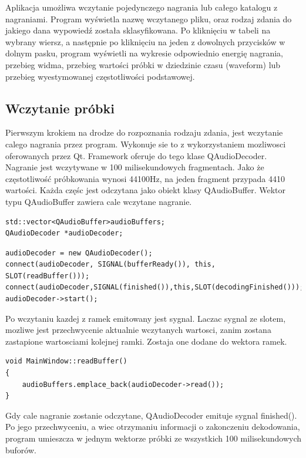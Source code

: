 \documentclass[a4paper,12 pt]{article}
\begin{document}
Aplikacja umożliwa wczytanie pojedynczego nagrania lub całego katalogu z nagraniami. Program wyświetla nazwę wczytanego pliku, oraz rodzaj zdania do jakiego dana wypowiedź została sklasyfikowana. Po kliknięciu w tabeli na wybrany wiersz, a następnie po kliknięciu na jeden z dowolnych przycisków w dolnym pasku, program wyświetli na wykresie odpowiednio energię nagrania, przebieg widma, przebieg wartości próbki w dziedzinie czasu (waveform) lub przebieg wyestymowanej częstotliwości podstawowej.
\subsection{Wczytanie próbki}
Pierwszym krokiem na drodze do rozpoznania rodzaju zdania, jest wczytanie calego nagrania przez program. Wykonuje sie to z wykorzystaniem mozliwosci oferowanych przez Qt. Framework oferuje do tego klase QAudioDecoder. 
Nagranie jest wczytywane w 100 milisekundowych fragmentach. Jako że częstotliwość próbkowania wynosi 44100Hz, na jeden fragment przypada 4410 wartości. Każda częśc jest odczytana jako obiekt klasy QAudioBuffer. Wektor typu QAudioBuffer zawiera cale wczytane nagranie.
\begin{lstlisting}
std::vector<QAudioBuffer>audioBuffers;
QAudioDecoder *audioDecoder;
\end{lstlisting}
\begin{lstlisting}
audioDecoder = new QAudioDecoder();
connect(audioDecoder, SIGNAL(bufferReady()), this, SLOT(readBuffer()));
connect(audioDecoder,SIGNAL(finished()),this,SLOT(decodingFinished()));
audioDecoder->start();
\end{lstlisting}
Po wczytaniu kazdej z ramek emitowany jest sygnal. Laczac sygnal ze slotem, mozliwe jest przechwycenie aktualnie wczytanych wartosci, zanim zostana zastapione wartosciami kolejnej ramki.
Zostaja one dodane do wektora ramek.
\begin{lstlisting}
void MainWindow::readBuffer()
{
    audioBuffers.emplace_back(audioDecoder->read());
}
\end{lstlisting}
Gdy cale nagranie zostanie odczytane, QAudioDecoder emituje sygnal finished(). Po jego przechwyceniu, a wiec otrzymaniu informacji o zakonczeniu dekodowania, program umieszcza w jednym wektorze próbki ze wszystkich 100 milisekundowych buforów.
\end{document}
